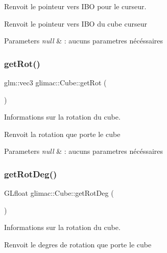 Renvoit le pointeur vers I\+BO pour le curseur. 

Renvoit le pointeur vers I\+BO du cube curseur


\begin{DoxyParams}{Parameters}
{\em null} & \+: aucuns parametres nécéssaires \\
\hline
\end{DoxyParams}
\mbox{\label{classglimac_1_1Cube_a1f4f0a3b4e1b4b320c4f7f3476e42985}} 
\subsubsection{\texorpdfstring{get\+Rot()}{getRot()}}
{\footnotesize\ttfamily glm\+::vec3 glimac\+::\+Cube\+::get\+Rot (\begin{DoxyParamCaption}{ }\end{DoxyParamCaption})\hspace{0.3cm}{\ttfamily [inline]}}



Informations sur la rotation du cube. 

Renvoit la rotation que porte le cube


\begin{DoxyParams}{Parameters}
{\em null} & \+: aucuns parametres nécéssaires \\
\hline
\end{DoxyParams}
\mbox{\label{classglimac_1_1Cube_ad642ba1d2cd3727b861716275497c5f7}} 
\subsubsection{\texorpdfstring{get\+Rot\+Deg()}{getRotDeg()}}
{\footnotesize\ttfamily G\+Lfloat glimac\+::\+Cube\+::get\+Rot\+Deg (\begin{DoxyParamCaption}{ }\end{DoxyParamCaption})\hspace{0.3cm}{\ttfamily [inline]}}



Informations sur la rotation du cube. 

Renvoit le degres de rotation que porte le cube


